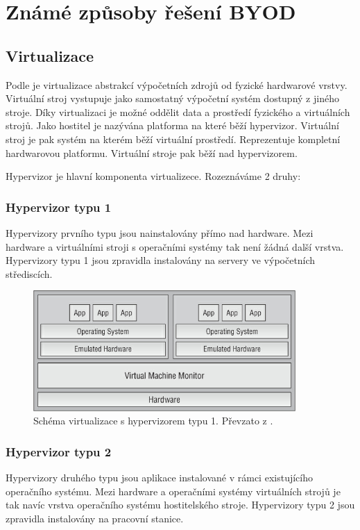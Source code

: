  
 
 
 
 \section{Známé způsoby řešení BYOD}%


\subsection{Virtualizace} 
Podle \cite{Shackleford} je virtualizace abstrakcí výpočetních zdrojů od fyzické hardwarové vrstvy. Virtuální stroj vystupuje jako samostatný výpočetní systém dostupný z jiného stroje. Díky virtualizaci je možné oddělit data a prostředí fyzického a virtuálních strojů. Jako hostitel je nazývána platforma na které běží hypervizor. Virtuální stroj je pak systém na kterém běží virtuální prostředí. Reprezentuje kompletní hardwarovou platformu. Virtuální stroje pak běží nad hypervizorem. 

Hypervizor je hlavní komponenta virtualizece. Rozeznáváme 2 druhy:

\subsubsection{Hypervizor typu 1}
Hypervizory prvního typu jsou nainstalovány přímo nad hardware. Mezi hardware a virtuálními stroji s operačními systémy tak není žádná další vrstva. Hypervizory typu 1 jsou zpravidla instalovány na servery ve výpočetních střediscích.

\begin{figure}[h!]
\centering
\includegraphics[width=10cm]{img/shackleford1}
\caption{Schéma virtualizace s hypervizorem typu 1. Převzato z \cite{Shackleford}.} 
\end{figure}

\subsubsection{Hypervizor typu 2}
Hypervizory druhého typu jsou aplikace instalované v rámci existujícího operačního systému. Mezi hardware a operačními systémy virtuálních strojů je tak navíc vrstva operačního systému hostitelského stroje. Hypervizory typu 2 jsou zpravidla instalovány na pracovní stanice.

